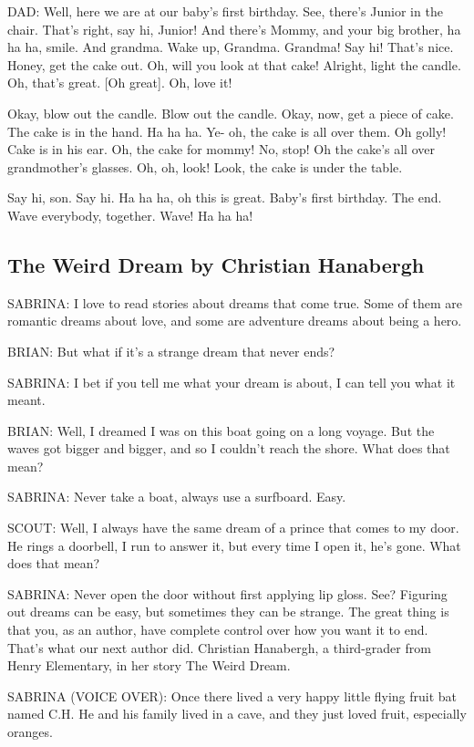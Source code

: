 DAD:
Well, here we are at our baby's first birthday.
See, there's Junior in the chair.
That's right, say hi, Junior!
And there's Mommy, and your big brother, ha ha ha, smile.
And grandma.
Wake up, Grandma.
Grandma!
Say hi!
That's nice.
Honey, get the cake out.
Oh, will you look at that cake!
Alright, light the candle.
Oh, that's great.
    [Oh great].
Oh, love it!

Okay, blow out the candle.
Blow out the candle.
Okay, now, get a piece of cake.
The cake is in the hand.
Ha ha ha.
Ye- oh, the cake is all over them.
Oh golly!
Cake is in his ear.
Oh, the cake for mommy!
No, stop!
Oh the cake's all over grandmother's glasses.
Oh, oh, look!
Look, the cake is under the table.

Say hi, son.
Say hi.
Ha ha ha, oh this is great.
Baby's first birthday.
The end.
Wave everybody, together.
Wave!
Ha ha ha!

\subsection{The Weird Dream by Christian Hanabergh}

SABRINA:
I love to read stories about dreams that come true.
Some of them are romantic dreams about love, and some are adventure dreams about being a hero.

BRIAN:
But what if it's a strange dream that never ends?

SABRINA:
I bet if you tell me what your dream is about, I can tell you what it meant.

BRIAN:
Well, I dreamed I was on this boat going on a long voyage.
But the waves got bigger and bigger, and so I couldn't reach the shore.
What does that mean?

SABRINA:
Never take a boat, always use a surfboard.
Easy.

SCOUT:
Well, I always have the same dream of a prince that comes to my door.
He rings a doorbell, I run to answer it, but every time I open it, he's gone.
What does that mean?

SABRINA:
Never open the door without first applying lip gloss.
See?
Figuring out dreams can be easy, but sometimes they can be strange.
The great thing is that you, as an author, have complete control over how you want it to end.
That's what our next author did.
Christian Hanabergh, a third-grader from Henry Elementary, in her story The Weird Dream.

SABRINA (VOICE OVER):
Once there lived a very happy little flying fruit bat named C.H.
He and his family lived in a cave, and they just loved fruit, especially oranges.

